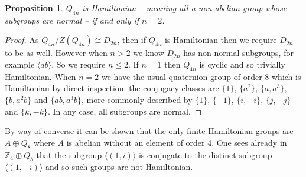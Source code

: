 \documentclass[12pt]{article}
\newtheorem{prop}[thm]{Proposition}
\begin{document}
\begin{prop}
$Q_{4n}$ is Hamiltonian -- meaning all a non-abelian group whose subgroups are normal -- if and only 
if $n=2$.
\end{prop}
\begin{proof}
As $Q_{4n}/Z(Q_{4n})\cong D_{2n}$, then if $Q_{4n}$ is Hamiltonian then we require
$D_{2n}$ to be as well.  However when $n>2$ we know $D_{2n}$ has non-normal subgroups,
for example $\langle ab\rangle$.  So we require $n\leq 2$.  If $n=1$ then $Q_{4n}$
is cyclic and so trivially Hamiltonian.  When $n=2$ we have the usual quaternion
group of order 8 which is Hamiltonian by direct inspection: the conjugacy classes
are $\{1\}$, $\{a^2\}$, $\{a,a^3\}$, $\{b,a^2b\}$ and $\{ab,a^3 b\}$, more commonly
described by $\{1\}$, $\{-1\}$, $\{i,-i\}$, $\{j,-j\}$ and $\{k,-k\}$.  In any case,
all subgroups are normal.
\end{proof}

By way of converse it can be shown that the only finite Hamiltonian groups are
$A\oplus Q_8$ where $A$ is abelian without an element of order 4.
One sees already in $\mathbb{Z}_4\oplus Q_8$ that the subgroup $\langle (1,i)\rangle$  is conjugate to the distinct subgroup $\langle (1,-i)\rangle$ and so such groups are not Hamiltonian.
\end{document}
